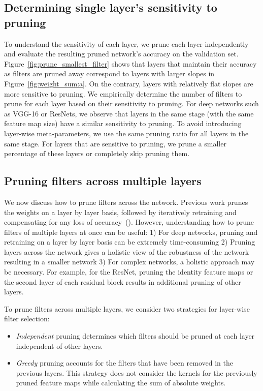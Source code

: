\documentclass{article} \usepackage{iclr2017_conference,times}
\begin{document}
\subsection{Determining single layer's sensitivity to pruning}


To understand the sensitivity of each layer, we prune each layer independently and evaluate the resulting pruned network's accuracy on the validation set.
Figure~\ref{fig:prune_smallest_filter} shows that layers that maintain their accuracy as filters are pruned away correspond to layers with larger slopes in Figure~\ref{fig:weight_sum:a}.
On the contrary, layers with relatively flat slopes are more sensitive to pruning.
We empirically determine the number of filters to prune for each layer based on their sensitivity to pruning.
For deep networks such as VGG-16 or ResNets, we observe that layers in the same stage (with the same feature map size) have a similar sensitivity to pruning.
To avoid introducing layer-wise meta-parameters, we use the same pruning ratio for all layers in the same stage.
For layers that are sensitive to pruning, we prune a smaller percentage of these layers or completely skip pruning them.

\subsection{Pruning filters across multiple layers}
We now discuss how to prune filters across the network. 
Previous work prunes the weights on a layer by layer basis, followed by iteratively retraining and compensating for any loss of accuracy~(\cite{han2015learning}).
However, understanding how to prune filters of multiple layers at once can be useful:
1) For deep networks, pruning and retraining on a layer by layer basis can be extremely time-consuming
2) Pruning layers across the network gives a holistic view of the robustness of the network resulting in a smaller network
3) For complex networks, a holistic approach may be necessary. For example, for the ResNet, pruning the identity feature maps or the second layer of each residual block results in additional pruning of other layers.

To prune filters across multiple layers, we consider two strategies for layer-wise filter selection:
\begin{itemize}
\item \emph{Independent} pruning determines which filters should be pruned at each layer independent of other layers.
\item \emph{Greedy} pruning accounts for the filters that have been removed in the previous layers.
This strategy does not consider the kernels for the previously pruned feature maps while calculating the sum of absolute weights.
\end{itemize}
\end{document}
